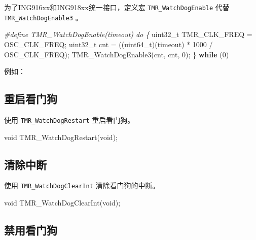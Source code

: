 \documentclass[
  12pt,
]{book}
\newenvironment{Shaded}{\begin{snugshade}}{\end{snugshade}}
\newcommand{\ControlFlowTok}[1]{\textcolor[rgb]{0.13,0.29,0.53}{\textbf{#1}}}
\newcommand{\DataTypeTok}[1]{\textcolor[rgb]{0.13,0.29,0.53}{#1}}
\newcommand{\DecValTok}[1]{\textcolor[rgb]{0.00,0.00,0.81}{#1}}
\newcommand{\NormalTok}[1]{#1}
\newcommand{\PreprocessorTok}[1]{\textcolor[rgb]{0.56,0.35,0.01}{\textit{#1}}}
\begin{document}
为了ING916xx和ING918xx统一接口，定义宏 \texttt{TMR\_WatchDogEnable} 代替 \texttt{TMR\_WatchDogEnable3} 。

\begin{Shaded}
\begin{Highlighting}[]
\PreprocessorTok{#define TMR_WatchDogEnable(timeout) do \{ }
  \DataTypeTok{uint32_t}\NormalTok{ TMR_CLK_FREQ = OSC_CLK_FREQ; }
  \DataTypeTok{uint32_t}\NormalTok{ cnt = ((}\DataTypeTok{uint64_t}\NormalTok{)(timeout) * }\DecValTok{1000}\NormalTok{ / OSC_CLK_FREQ); }
\NormalTok{  TMR_WatchDogEnable3(cnt, cnt, }\DecValTok{0}\NormalTok{); }
\NormalTok{  \} }\ControlFlowTok{while}\NormalTok{ (}\DecValTok{0}\NormalTok{)}
\end{Highlighting}
\end{Shaded}

例如：

\hypertarget{ux91cdux542fux770bux95e8ux72d7}{%
\subsection{重启看门狗}\label{ux91cdux542fux770bux95e8ux72d7}}

使用 \texttt{TMR\_WatchDogRestart} 重启看门狗。

\begin{Shaded}
\begin{Highlighting}[]
\DataTypeTok{void}\NormalTok{ TMR_WatchDogRestart(}\DataTypeTok{void}\NormalTok{);}
\end{Highlighting}
\end{Shaded}

\hypertarget{ux6e05ux9664ux4e2dux65ad-1}{%
\subsection{清除中断}\label{ux6e05ux9664ux4e2dux65ad-1}}

使用 \texttt{TMR\_WatchDogClearInt} 清除看门狗的中断。

\begin{Shaded}
\begin{Highlighting}[]
\DataTypeTok{void}\NormalTok{ TMR_WatchDogClearInt(}\DataTypeTok{void}\NormalTok{);}
\end{Highlighting}
\end{Shaded}

\hypertarget{ux7981ux7528ux770bux95e8ux72d7}{%
\subsection{禁用看门狗}\label{ux7981ux7528ux770bux95e8ux72d7}}
\end{document}
